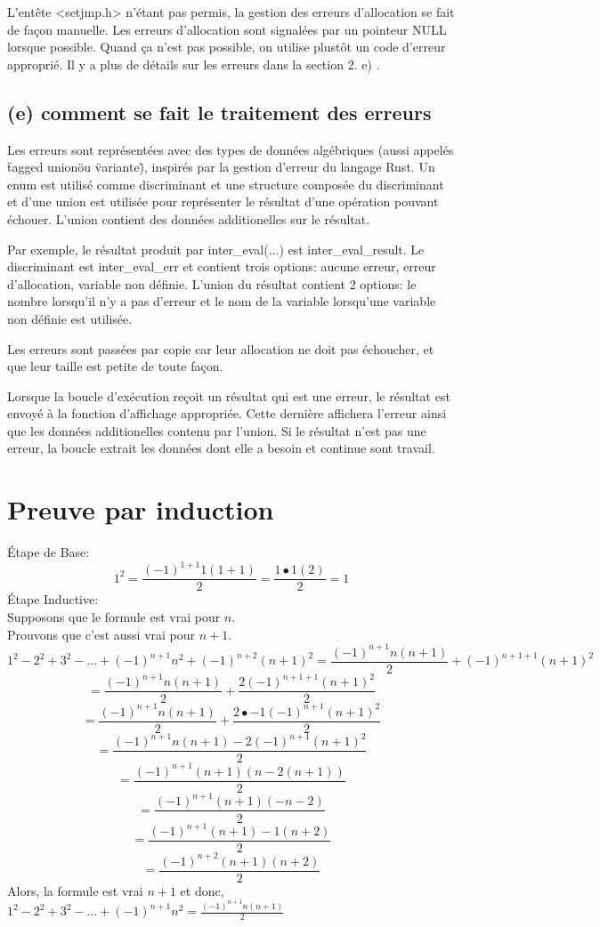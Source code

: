 \documentclass[a4paper,12pt]{article}
\begin{document}
	L'entête <setjmp.h> n'étant pas permis, la gestion des erreurs d'allocation se fait de
	façon manuelle. Les erreurs d'allocation sont signalées par un pointeur NULL lorsque
	possible. Quand ça n'est pas possible, on utilise plustôt un code d'erreur approprié.
	Il y a plus de détails sur les erreurs dans la section 2. e) .

	\subsection{(e) comment se fait le traitement des erreurs}
	Les erreurs sont représentées avec des types de données algébriques (aussi appelés  \"tagged union\"
	ou \"variante\"), inspirés par la gestion d'erreur du langage Rust. Un enum est utilisé comme
	discriminant et une structure composée du discriminant et d'une union est utilisée pour représenter
	le résultat d'une opération pouvant échouer. L'union contient des données additionelles sur le
	résultat.

	Par exemple, le résultat produit par inter\_eval(...) est inter\_eval\_result. Le discriminant
	est inter\_eval\_err et contient trois options: aucune erreur, erreur d'allocation, variable
	non définie. L'union du résultat contient 2 options: le nombre lorsqu'il n'y a pas d'erreur et
	le nom de la variable lorsqu'une variable non définie est utilisée.

	Les erreurs sont passées par copie car leur allocation ne doit pas échoucher, et que leur taille
	est petite de toute façon.

	Lorsque la boucle d'exécution reçoit un résultat qui est une erreur, le résultat est envoyé à la
	fonction d'affichage appropriée. Cette dernière affichera l'erreur ainsi que les données additionelles
	contenu par l'union. Si le résultat n'est pas une erreur, la boucle extrait les données dont elle
	a besoin et continue sont travail.

\section{Preuve par induction}
Étape de Base:\\
	\[1^2 = \frac{(-1)^{1+1}1(1+1)}{2} = \frac{1\bullet 1 (2)}{2} = 1\]
Étape Inductive:\\
	Supposons que le formule est vrai pour $n$.\\
	Prouvons que c'est aussi vrai pour $n+1$.
	\[1^2 - 2^2 + 3^2 - ... + (-1)^{n+1}n^2 + (-1)^{n+2}(n+1)^2 = \frac{(-1)^{n+1}n(n+1)}{2}  + (-1)^{n+1+1}(n+1)^2 \]
	\[= \frac{(-1)^{n+1}n(n+1)}{2}  + \frac{2(-1)^{n+1+1}(n+1)^2}{2}\]
	\[= \frac{(-1)^{n+1}n(n+1)}{2}  + \frac{2\bullet-1(-1)^{n+1}(n+1)^2}{2}\]
	\[= \frac{(-1)^{n+1}n(n+1)  -2(-1)^{n+1}(n+1)^2}{2}\]
	\[= \frac{(-1)^{n+1}(n+1)(n  -2(n+1))}{2}\]
	\[= \frac{(-1)^{n+1}(n+1)(-n-2)}{2}\]
	\[= \frac{(-1)^{n+1}(n+1) -1 (n+2)}{2}\]
	\[= \frac{(-1)^{n+2}(n+1)(n+2)}{2}\]
	Alors, la formule est vrai $n+1$ et donc, $1^2 - 2^2 + 3^2 - ... + (-1)^{n+1}n^2 = \frac{(-1)^{n+1}n(n+1)}{2}$
\end{document}
